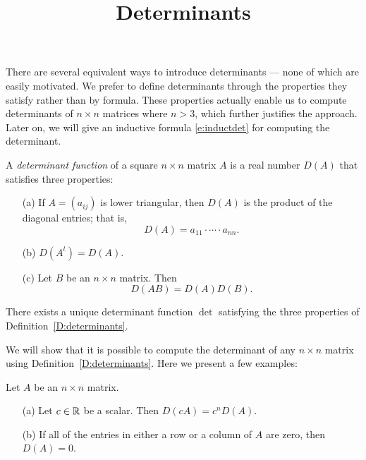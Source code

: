 \documentclass{ximera}
\title{Determinants}
\begin{document}
\begin{abstract}
\end{abstract}
\maketitle

 
\label{S:det}
 
There are several equivalent ways to introduce determinants --- none of which 
are easily motivated.  We prefer to define determinants through the properties 
they satisfy rather than by formula.  These properties actually enable us to 
compute determinants of $n\times n$ matrices where $n>3$, which further 
justifies the approach. Later on, we will give an inductive formula 
\eqref{e:inductdet} for computing the determinant. 
 
\begin{definition}  \label{D:determinants}
A {\em determinant function} of a square $n\times n$ matrix $A$ is a real
number $D(A)$ that satisfies three properties:
\begin{itemize} 
\item[(a)]  If $A=(a_{ij})$ is lower 
triangular, then
 $D(A)$ is the product of the diagonal entries;
that is,
\[
D(A) = a_{11}\cdot\cdots\cdot a_{nn}.
\]
\item[(b)]  $D(A^t)=D(A)$.
\item[(c)]  Let $B$ be an $n\times n$ matrix.  
Then
\begin{equation} \label{e:detproduct}
D(AB) = D(A) D(B).
\end{equation}
\end{itemize}
\end{definition} 

\begin{theorem}  \label{T:determinants}
There exists a unique determinant function $\det$ satisfying the three
properties of Definition~\ref{D:determinants}.
\end{theorem}

We will show that it is possible to compute the determinant of
any $n\times n$ matrix using Definition~\ref{D:determinants}.
Here we present a few examples:

\begin{lemma}
Let $A$ be an $n\times n$ matrix.
\begin{itemize}
\item[(a)]   Let $c\in\mbox{$\Bbb{R}$}$ be a scalar.  Then $D(cA) = c^n D(A)$.
\item[(b)] If all of the entries in either a row or a column of $A$ are 
zero, then $D(A)=0$.
\end{itemize}
\end{lemma}
\end{document}
